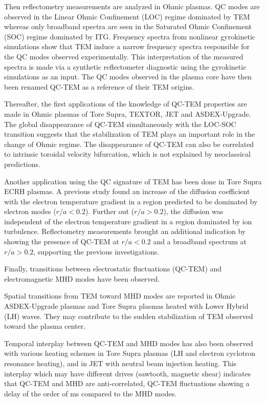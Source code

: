 Then reflectometry measurements are analyzed in Ohmic plasmas. QC modes are observed in the Linear Ohmic Confinement (LOC) regime dominated by TEM whereas only broadband spectra are seen in the Saturated Ohmic Confinement (SOC) regime dominated by ITG. Frequency spectra from nonlinear gyrokinetic simulations show that TEM induce a narrow frequency spectra responsible for the QC modes observed experimentally. This interpretation of the measured spectra is made via a synthetic reflectometer diagnostic using the gyrokinetic simulations as an input. The QC modes observed in the plasma core have then been renamed QC-TEM as a reference of their TEM origins.

Thereafter, the first applications of the knowledge of QC-TEM properties are made in Ohmic plasmas of Tore Supra, TEXTOR, JET and ASDEX-Upgrade. The global disappearance of QC-TEM simultaneously with the LOC-SOC transition suggests that the stabilization of TEM plays an important role in the change of Ohmic regime. The disappearance of QC-TEM can also be correlated to intrinsic toroidal velocity bifurcation, which is not explained by neoclassical predictions.

Another application using the QC signature of TEM has been done in Tore Supra ECRH plasmas. A previous study found an increase of the diffusion coefficient with the electron temperature gradient in a region predicted to be dominated by electron modes ($r/a<0.2$). Further out ($r/a>0.2$), the diffusion was independent of the electron temperature gradient in a region dominated by ion turbulence. Reflectometry measurements brought an additional indication by showing the presence of QC-TEM at $r/a<0.2$ and a broadband spectrum at $r/a>0.2$, supporting the previous investigations. 

Finally, transitions between electrostatic fluctuations (QC-TEM) and electromagnetic MHD modes have been observed.

Spatial transitions from TEM toward MHD modes are reported in Ohmic ASDEX-Upgrade plasmas and Tore Supra plasmas heated with Lower Hybrid (LH) waves. They may contribute to the sudden stabilization of TEM observed toward the plasma center.

Temporal interplay between QC-TEM and MHD modes has also been observed with various heating schemes in Tore Supra plasmas (LH and electron cyclotron resonance heating), and in JET with neutral beam injection heating. This interplay which may have different drives (sawtooth, magnetic shear) indicates that QC-TEM and MHD are anti-correlated, QC-TEM fluctuations showing a delay of the order of ms compared to the MHD modes.

